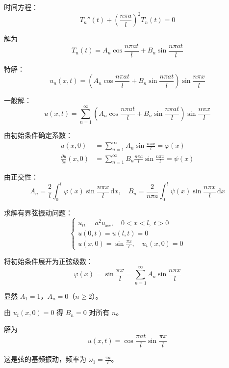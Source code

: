 时间方程：
\begin{equation}
    T_n''(t) + \left(\frac{n\pi a}{l}\right)^2 T_n(t) = 0
\end{equation}

解为
\begin{equation}
    T_n(t) = A_n\cos\frac{n\pi a t}{l} + B_n\sin\frac{n\pi a t}{l}
\end{equation}

特解：
\begin{equation}
    u_n(x, t) = \left(A_n\cos\frac{n\pi a t}{l} + B_n\sin\frac{n\pi a t}{l}\right)\sin\frac{n\pi x}{l}
\end{equation}

一般解：
\begin{equation}
    u(x, t) = \sum_{n=1}^{\infty}\left(A_n\cos\frac{n\pi a t}{l} + B_n\sin\frac{n\pi a t}{l}\right)\sin\frac{n\pi x}{l}
\end{equation}

由初始条件确定系数：
\begin{align}
    u(x, 0) &= \sum_{n=1}^{\infty} A_n\sin\frac{n\pi x}{l} = \varphi(x) \\
    \frac{\partial u}{\partial t}(x, 0) &= \sum_{n=1}^{\infty} B_n\frac{n\pi a}{l}\sin\frac{n\pi x}{l} = \psi(x)
\end{align}

由正交性：
\begin{equation}
    \boxed{A_n = \frac{2}{l}\int_0^l \varphi(x)\sin\frac{n\pi x}{l}\,\mathrm{d}x, \quad B_n = \frac{2}{n\pi a}\int_0^l \psi(x)\sin\frac{n\pi x}{l}\,\mathrm{d}x}
\end{equation}

\begin{lizi}{}{}
求解有界弦振动问题：
\begin{equation}
    \begin{cases}
        u_{tt} = a^2 u_{xx}, \quad 0 < x < l, \; t > 0 \\
        u(0, t) = u(l, t) = 0 \\
        u(x, 0) = \sin\frac{\pi x}{l}, \quad u_t(x, 0) = 0
        \end{cases}
\end{equation}

\begin{jie}
    将初始条件展开为正弦级数：
    \begin{equation}
        \varphi(x) = \sin\frac{\pi x}{l} = \sum_{n=1}^{\infty} A_n\sin\frac{n\pi x}{l}
    \end{equation}
    
    显然 $A_1 = 1$，$A_n = 0$（$n \geq 2$）。
    
    由 $u_t(x, 0) = 0$ 得 $B_n = 0$ 对所有 $n$。
    
    解为
    \begin{equation}
        u(x, t) = \cos\frac{\pi a t}{l}\sin\frac{\pi x}{l}
    \end{equation}
    
    这是弦的基频振动，频率为 $\omega_1 = \frac{\pi a}{l}$。
\end{jie}
\end{lizi}

